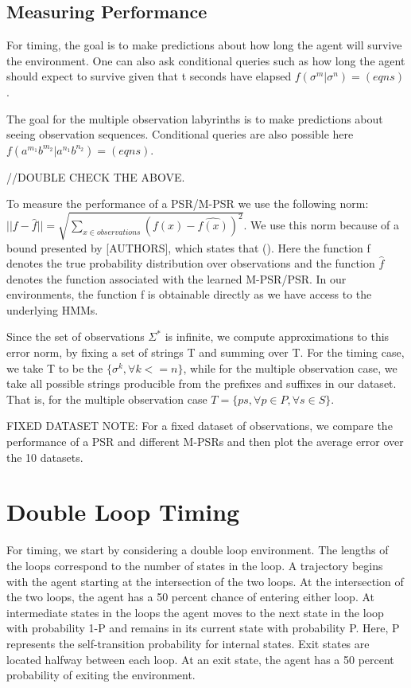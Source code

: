 \subsection{Measuring Performance}
For timing, the goal is to make predictions about how long the agent will survive the environment. One can also ask conditional queries such as how long the agent should expect to survive given that t seconds have elapsed $f(\sigma^m|\sigma^n) = (eqns)$. 

The goal for the multiple observation labyrinths is to make predictions about seeing observation sequences. Conditional queries are also possible here $f(a^{m_1}b^{m_2}|a^{n_1}b^{n_2}) = (eqns)$.

//DOUBLE CHECK THE ABOVE.

To measure the performance of a PSR/M-PSR we use the following norm:
$||f - \hat{f}|| = \sqrt{\sum\nolimits_{x \in observations}(f(x) - \hat{f(x)})^2}$. We use this norm because of a bound presented by [AUTHORS], which states that (). Here the function f denotes the true probability distribution over observations and the function $\hat{f}$ denotes the function associated with the learned M-PSR/PSR. In our environments, the function f is obtainable directly as we have access to the underlying HMMs.

Since the set of observations $\Sigma^*$ is infinite, we compute approximations to this error norm, by fixing a set of strings T and summing over T. For the timing case, we take T to be the $\{\sigma^k, \forall k<=n\}$, while for the multiple observation case, we take all possible strings producible from the prefixes and suffixes in our dataset. That is, for the multiple observation case $T = \{ps, \forall p \in P, \forall s \in S\}$.

FIXED DATASET NOTE:
For a fixed dataset of observations, we compare the performance of a PSR and different M-PSRs and then plot the average error over the 10 datasets.

\section{Double Loop Timing}

For timing, we start by considering a double loop environment. The lengths of the loops correspond to the number of states in the loop. A trajectory begins with the agent starting at the intersection of the two loops. At the intersection of the two loops, the agent has a 50 percent chance of entering either loop. At intermediate states in the loops the agent moves to the next state in the loop with probability 1-P and remains in its current state with probability P. Here, P represents the self-transition probability for internal states. Exit states are located halfway between each loop. At an exit state, the agent has a 50 percent probability of exiting the environment. 

